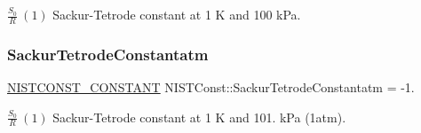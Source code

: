 $\frac{S_0}{R} \ (1)$ Sackur-\/\+Tetrode constant at 1 K and 100 k\+Pa. \mbox{\label{group___n_i_s_t_const-_sackur_tetrode_constant_ga7f3efde326ea5cfe5e2d85d81a92fb3b}} 
\subsubsection{\texorpdfstring{Sackur\+Tetrode\+Constantatm}{SackurTetrodeConstantatm}}
{\footnotesize\ttfamily \mbox{\hyperlink{_n_i_s_t_const_8hpp_a2b0fc1d7452373f816175dd86ce26729}{N\+I\+S\+T\+C\+O\+N\+S\+T\+\_\+\+C\+O\+N\+S\+T\+A\+NT}} N\+I\+S\+T\+Const\+::\+Sackur\+Tetrode\+Constantatm = -\/1.}

$\frac{S_0}{R} \ (1)$ Sackur-\/\+Tetrode constant at 1 K and 101. k\+Pa (1atm). 